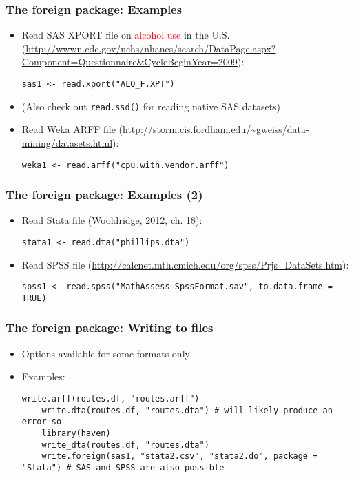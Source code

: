 \documentclass[10pt]{beamer}
\theoremstyle{definition}
\begin{document}
\begin{frame}[fragile]
\frametitle{The \textbf{foreign} package: Examples}
\begin{itemize}
	\item Read SAS XPORT file on \textcolor{red}{alcohol use} in the U.S. (\url{http://wwwn.cdc.gov/nchs/nhanes/search/DataPage.aspx?Component=Questionnaire&CycleBeginYear=2009}):
	\begin{lstlisting}[style = rstyle, breaklines]
	sas1 <- read.xport("ALQ_F.XPT")
	\end{lstlisting}
	\item (Also check out \texttt{read.ssd()} for reading native SAS datasets)
	\item Read Weka ARFF file (\url{http://storm.cis.fordham.edu/~gweiss/data-mining/datasets.html}):
	\begin{lstlisting}[style = rstyle, breaklines]
	weka1 <- read.arff("cpu.with.vendor.arff")
	\end{lstlisting}
\end{itemize}
\end{frame}

\begin{frame}[fragile]
\frametitle{The \textbf{foreign} package: Examples (2)}
\begin{itemize}
	\item Read Stata file (Wooldridge, 2012, ch. 18):
	\begin{lstlisting}[style = rstyle, breaklines]
	stata1 <- read.dta("phillips.dta")
	\end{lstlisting}
	\item Read SPSS file (\url{http://calcnet.mth.cmich.edu/org/spss/Prjs_DataSets.htm}):
	\begin{lstlisting}[style = rstyle, breaklines]
	spss1 <- read.spss("MathAssess-SpssFormat.sav", to.data.frame = TRUE)
	\end{lstlisting}
\end{itemize}
\end{frame}

\begin{frame}[fragile]
\frametitle{The \textbf{foreign} package: Writing to files}
\begin{itemize}
	\item Options available for some formats only
	\item Examples:
	\begin{lstlisting}[style = rstyle, breaklines]
	write.arff(routes.df, "routes.arff")
	write.dta(routes.df, "routes.dta") # will likely produce an error so
	library(haven)
	write_dta(routes.df, "routes.dta")
	write.foreign(sas1, "stata2.csv", "stata2.do", package = "Stata") # SAS and SPSS are also possible
	\end{lstlisting}
\end{itemize}
\end{frame}
\end{document}
